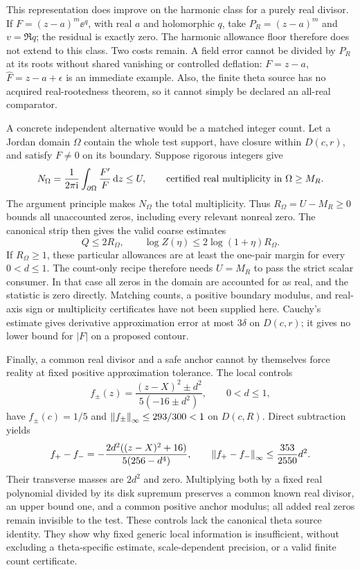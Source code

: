 This representation does improve on the harmonic class for a
purely real divisor. If $F=(z-a)^m\ee^q$, with real $a$ and
holomorphic $q$, take $P_R=(z-a)^m$ and $v=\Re q$; the residual
is exactly zero. The harmonic allowance floor therefore does
not extend to this class.
Two costs remain. A field error cannot be divided by $P_R$
at its roots without shared vanishing or controlled deflation:
$F=z-a$, $\widehat F=z-a+\epsilon$ is an immediate example.
Also, the finite theta source has no acquired real-rootedness
theorem, so it cannot simply be declared an all-real comparator.

A concrete independent alternative would be a matched integer
count. Let a Jordan domain $\Omega$ contain the whole test
support, have closure within $D(c,r)$, and satisfy
$F\ne0$ on its boundary. Suppose rigorous integers give
\[
 N_\Omega=\frac1{2\pi\mathrm i}\int_{\partial\Omega}\frac{F'}F\,\mathrm d z
          \le U,\qquad
 \hbox{certified real multiplicity in }\Omega\ge M_R.
\]
The argument principle makes $N_\Omega$ the total multiplicity.
Thus $R_\Omega=U-M_R\ge0$ bounds all unaccounted zeros,
including every relevant nonreal zero. The canonical strip
then gives the valid coarse estimates
\begin{equation}\label{eq:count-only}
 Q\le2R_\Omega,\qquad
 \log Z(\eta)\le2\log(1+\eta)R_\Omega .
\end{equation}
If $R_\Omega\ge1$, these particular allowances are at least
the one-pair margin for every $0<d\le1$. The count-only recipe
therefore needs $U=M_R$ to pass the strict scalar consumer.
In that case all zeros in the domain are accounted for as real,
and the statistic is zero directly. Matching counts, a positive
boundary modulus, and real-axis sign or multiplicity certificates
have not been supplied here. Cauchy's estimate gives derivative
approximation error at most $3\delta$ on $D(c,r)$; it gives
no lower bound for $|F|$ on a proposed contour.

Finally, a common real divisor and a safe anchor cannot by
themselves force reality at fixed positive approximation tolerance.
The local controls
\begin{equation}\label{eq:real-divisor-control}
 f_\pm(z)=\frac{(z-X)^2\pm d^2}{5(-16\pm d^2)},
 \qquad 0<d\le1,
\end{equation}
have $f_\pm(c)=1/5$ and
$\left\|f_\pm\right\|_\infty\le293/300<1$ on $D(c,R)$.
Direct subtraction yields
\[
 f_+-f_-=
 -\frac{2d^2((z-X)^2+16)}{5(256-d^4)},\qquad
 \left\|f_+-f_-\right\|_\infty\le\frac{353}{2550}d^2.
\]
Their transverse masses are $2d^2$ and zero. Multiplying both
by a fixed real polynomial divided by its disk supremum
preserves a common known real divisor, an upper bound one,
and a common positive anchor modulus; all added real zeros
remain invisible to the test. These controls lack the canonical
theta source identity. They show why fixed generic local
information is insufficient, without excluding a theta-specific
estimate, scale-dependent precision, or a valid finite count
certificate.

